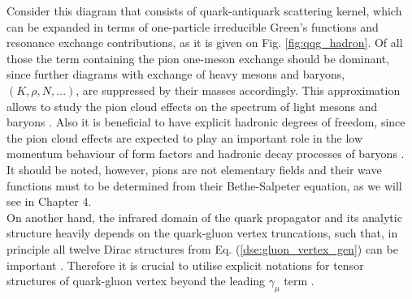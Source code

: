 Consider this diagram that consists of quark-antiquark scattering kernel, which can be expanded in terms of one-particle irreducible Green's functions and resonance exchange contributions, as it is given on Fig. \ref{fig:qqg_hadron}. Of all those the term containing the pion one-meson exchange should be dominant, since further diagrams with exchange of heavy mesons and baryons, $(K, \rho, N, ...)$, are suppressed by their masses accordingly. 
This approximation allows to study the pion cloud effects on the spectrum of light mesons \cite{Fischer:2007ze,Fischer:2008sp,Fischer:2008wy} and 
baryons \cite{Sanchis-Alepuz:2014wea}. Also it is beneficial to have explicit hadronic degrees of freedom, since the pion cloud effects 
are expected to play an important role in the low momentum behaviour of form factors and hadronic decay processes of baryons
\cite{Thomas:1981vc,Miller:2002ig,Ramalho:2008dp,Cloet:2012cy,Eichmann:2011vu, Eichmann:2011aa,Sanchis-Alepuz:2013iia}. It should be noted, however, pions are not elementary fields and their wave functions must to be determined from their Bethe-Salpeter equation, as we will see in Chapter 4. \\

On another hand, the infrared domain of the quark propagator and its analytic structure heavily depends on the quark-gluon vertex truncations, such that, in principle all twelve Dirac structures from Eq. (\ref{dse:gluon_vertex_gen}) can be important \cite{Skullerud:2003qu,Kizilersu:2006et}. Therefore it is crucial to  utilise explicit notations for tensor structures of quark-gluon vertex beyond the leading $\gamma_\mu$ term \cite{Chang:2009zb,Chang:2010hb,Chang:2011ei,Heupel:2014ina,Williams:2014iea}. \\ 

